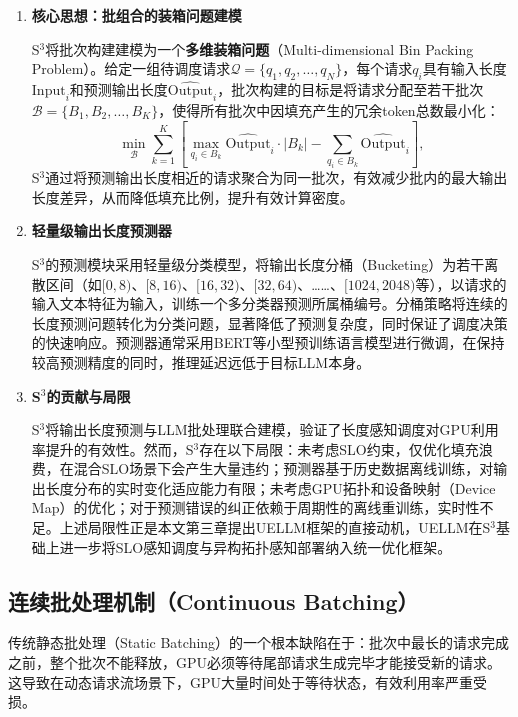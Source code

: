 \begin{enumerate}
   
\item \textbf{核心思想：批组合的装箱问题建模}

S$^3$将批次构建建模为一个\textbf{多维装箱问题}（Multi-dimensional Bin Packing Problem）。给定一组待调度请求$\mathcal{Q} = \{q_1, q_2, \ldots, q_N\}$，每个请求$q_i$具有输入长度$\text{Input}_i$和预测输出长度$\widehat{\text{Output}}_i$，批次构建的目标是将请求分配至若干批次$\mathcal{B} = \{B_1, B_2, \ldots, B_K\}$，使得所有批次中因填充产生的冗余token总数最小化：
\begin{equation}
  \min_{\mathcal{B}} \sum_{k=1}^{K} \left[ \max_{q_i \in B_k} \widehat{\text{Output}}_i \cdot |B_k|
  - \sum_{q_i \in B_k} \widehat{\text{Output}}_i \right] ,
  \label{eq:s3_objective}
\end{equation}
S$^3$通过将预测输出长度相近的请求聚合为同一批次，有效减少批内的最大输出长度差异，从而降低填充比例，提升有效计算密度。

\item \textbf{轻量级输出长度预测器}

S$^3$的预测模块采用轻量级分类模型，将输出长度分桶（Bucketing）为若干离散区间（如$[0,8)$、$[8,16)$、$[16,32)$、$[32,64)$、……、$[1024,2048)$等），以请求的输入文本特征为输入，训练一个多分类器预测所属桶编号。分桶策略将连续的长度预测问题转化为分类问题，显著降低了预测复杂度，同时保证了调度决策的快速响应。预测器通常采用BERT等小型预训练语言模型进行微调，在保持较高预测精度的同时，推理延迟远低于目标LLM本身。

\item \textbf{S$^3$的贡献与局限}

S$^3$将输出长度预测与LLM批处理联合建模，验证了长度感知调度对GPU利用率提升的有效性。然而，S$^3$存在以下局限：未考虑SLO约束，仅优化填充浪费，在混合SLO场景下会产生大量违约；预测器基于历史数据离线训练，对输出长度分布的实时变化适应能力有限；未考虑GPU拓扑和设备映射（Device Map）的优化；对于预测错误的纠正依赖于周期性的离线重训练，实时性不足。上述局限性正是本文第三章提出UELLM框架的直接动机，UELLM在S$^3$基础上进一步将SLO感知调度与异构拓扑感知部署纳入统一优化框架\cite{he2024uellm}。

\end{enumerate}
\subsection{连续批处理机制（Continuous Batching）}

传统静态批处理（Static Batching）的一个根本缺陷在于：批次中最长的请求完成之前，整个批次不能释放，GPU必须等待尾部请求生成完毕才能接受新的请求。这导致在动态请求流场景下，GPU大量时间处于等待状态，有效利用率严重受损。

